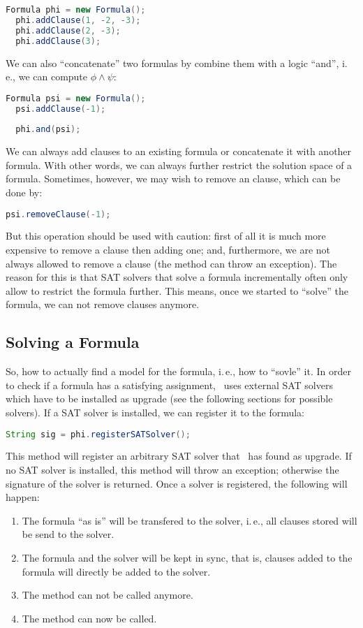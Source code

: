 \documentclass[a4paper, ukenglish, twoside, openright]{jdrasilmanual}
\begin{document}
\begin{lstlisting}[language=Java]
  Formula phi = new Formula();
  phi.addClause(1, -2, -3);
  phi.addClause(2, -3);
  phi.addClause(3);
\end{lstlisting}

We can also ``concatenate'' two formulas by combine them with a logic
``and'', i.\,e., we can compute $\phi\wedge\psi$:

\begin{lstlisting}[language=Java]
  Formula psi = new Formula();
  psi.addClause(-1);
  
  phi.and(psi);
\end{lstlisting}

We can always add clauses to an existing formula or concatenate it
with another formula. With other words, we can always further
restrict the solution space of a formula. Sometimes, however, we may
wish to remove an clause, which can be done by:
\begin{lstlisting}[language=Java]
  psi.removeClause(-1);
\end{lstlisting}
But this operation should be used with caution: first of all it is
much more expensive to remove a clause then adding one; and,
furthermore, we are not always allowed to remove a clause (the method
can throw an exception). The reason for this is that SAT solvers that
solve a formula incrementally often only allow to restrict the formula
further. This means, once we started to ``solve'' the formula, we
can not remove clauses anymore.

\subsection{Solving a Formula}
So, 
how to actually find a model for the formula, i.\,e., how to
``sovle'' it. In order to check if a formula has a satisfying
assignment, \Jdrasil\ uses external SAT solvers which have to be
installed as upgrade (see the following sections for possible
solvers). If a SAT solver is installed, we can register it to the
formula:
\begin{lstlisting}[language=Java]
  String sig = phi.registerSATSolver();
\end{lstlisting}
This method will register an arbitrary SAT solver that \Jdrasil\ has
found as upgrade. If no SAT solver is installed, this method will
throw an exception; otherwise the signature of the solver is
returned. Once a solver is registered, the following will happen:
\begin{enumerate}
  \item The formula ``as is'' will be transfered to the solver,
    i.\,e., all clauses stored will be send to the solver.
  \item The formula and the solver will be kept in sync, that is,
    clauses added to the formula will directly be added to the solver.
  \item The method  can not be called
    anymore.
  \item The method  can now be called.
\end{enumerate}
\end{document}
